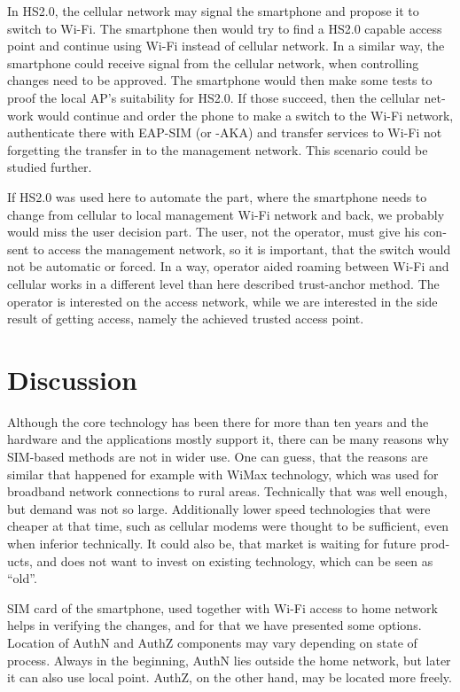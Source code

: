 \documentclass[12pt,a4paper,english]{tutthesis}
\begin{document}
\begin{otherlanguage}{english}
In HS2.0, the cellular network may signal the smartphone and
propose it to switch to Wi-Fi. The smartphone then would try to find a HS2.0 capable
access point and continue using Wi-Fi instead of cellular network.
In a similar way, the smartphone could receive signal from the cellular
network, when controlling changes need to be approved. The smartphone
would then make some tests to proof the local AP's suitability for 
HS2.0. If those succeed, then the cellular network would continue and order the 
phone to make a switch to the Wi-Fi network, authenticate there with 
EAP-SIM (or -AKA) and transfer services to Wi-Fi not forgetting 
the transfer in to the management network. This scenario could be 
studied further.


If HS2.0 was used here to automate the part, where
the smartphone needs to change from cellular to local
management Wi-Fi network and back, we probably would
miss the user decision part. The user, not the operator,
 must give his consent to access the management network, so
it is important, that the switch would not be automatic or forced.
In a way, operator aided roaming between Wi-Fi and cellular
works in a different level than here described trust-anchor method.
The operator is interested on the access network, while
we are interested in the side result of getting access, namely 
the achieved trusted access point.






\section{Discussion}
\label{sec-6-5}

Although the core technology has been there for more than ten years and
the hardware and the applications mostly support it, 
there can be many reasons why SIM-based methods are not in wider use. 
One can guess, that the reasons are similar that happened for example with 
WiMax technology, which was used for broadband network connections to
rural areas. Technically that was well enough, but demand was not so
large. Additionally lower speed technologies that were cheaper at that
time, such as cellular modems were thought to be sufficient, even when
inferior technically.
It could also be, that market is waiting for future products, and does 
not want to invest on existing technology, which can be seen as ``old''.



SIM card of the smartphone, used together with Wi-Fi access to home network 
helps in verifying the changes, and for that we have presented some options.
Location of AuthN and AuthZ components may vary depending on state of process.
Always in the beginning, AuthN lies outside the home network, but
later it can also use local point. AuthZ, on the other hand, may be located more freely.


\end{otherlanguage}
\end{document}
